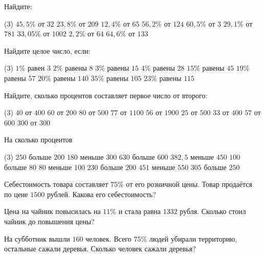 \begin{class}[number=7]
	\begin{listofex}
		\item Найдите: \begin{tasks}(3)
			\task \( 45,5\% \) от \( 32 \)
			\task \( 23,8\% \) от \( 209 \)
			\task \( 12,4\% \) от \( 65 \)
			\task \( 56,2\% \) от \( 124 \)
			\task \( 60,5\% \) от \( 3 \)
			\task \( 29,1\% \) от \( 781 \)
			\task \( 33,05\% \) от \( 1002 \)
			\task \( 2,2\% \) от \( 64 \)
			\task \( 64,6\% \) от \( 133 \)
		\end{tasks}
		\item Найдите целое число, если: \begin{tasks}(3)
			\task \( 1\% \) равен \( 3 \)
			\task \( 2\% \) равены \( 8 \)
			\task \( 3\% \) равены \( 15 \)
			\task \( 4\% \) равены \( 28 \)
			\task \( 15\% \) равены \( 45 \)
			\task \( 19\% \) равены \( 57 \)
			\task \( 20\% \) равены \( 140 \)
			\task \( 35\% \) равены \( 105 \)
			\task \( 23\% \) равены \( 115 \)
		\end{tasks}
		\item Найдите, сколько процентов составляет первое число от второго:
		\begin{tasks}(3)
			\task \( 40 \) от \( 400 \)
			\task \( 60 \) от \( 200 \)
			\task \( 80 \) от \( 500 \)
			\task \( 77 \) от \( 1100 \)
			\task \( 56 \) от \( 1900 \)
			\task \( 25 \) от \( 500 \)
			\task \( 33 \) от \( 400 \)
			\task \( 57 \) от \( 600 \)
			\task \( 300 \) от \( 300 \)
		\end{tasks}
		\item На сколько процентов \begin{tasks}(3)
			\task \( 250 \) больше \( 200 \)
			\task \( 180 \) меньше \( 300 \)
			\task \( 630 \) больше \( 600 \)
			\task \( 382,5 \) меньше \( 450 \)
			\task \( 100 \) больше \( 80 \)
			\task \( 80 \) меньше \( 100 \)
			\task \( 230 \) больше \( 200 \)
			\task \( 451 \) меньше \( 550 \)
			\task \( 305 \) больше \( 250 \)
		\end{tasks}
		\item Себестоимость товара составляет \( 75\% \) от его розничной цены. Товар продаётся по цене \( 1500 \) рублей. Какова его себестоимость?
		\item Цена на чайник повысилась на \( 11\% \) и стала равна \( 1332 \) рубля. Сколько стоил чайник до повышения цены? 
		\item На субботник вышли \( 160  \) человек. Всего \( 75\% \) людей убирали территорию, остальные сажали деревья. Сколько человек сажали деревья?

\end{listofex}
\end{class}
